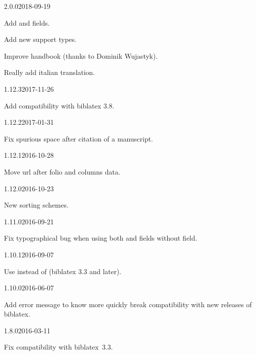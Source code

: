 \documentclass{ltxdockit}[2011/03/25]
\newcommand{\biblatex}{biblatex\xspace}
\begin{document}
\begin{changelog}

\begin{release}{2.0.0}{2018-09-19}
  \item Add  and  fields.
  \item Add new support types.
  \item Improve handbook (thanks to Dominik Wujastyk).
  \item Really add italian translation.
\end{release}

\begin{release}{1.12.3}{2017-11-26}
  \item Add compatibility with biblatex 3.8.
\end{release}
\begin{release}{1.12.2}{2017-01-31}
  \item Fix spurious space after citation of a manuscript.
\end{release}

\begin{release}{1.12.1}{2016-10-28}
  \item Move url after folio and columns data.
\end{release}

\begin{release}{1.12.0}{2016-10-23}
  \item New sorting schemes.
\end{release}

\begin{release}{1.11.0}{2016-09-21}
  \item Fix typographical bug when using both  and  fields without  field.
\end{release}

\begin{release}{1.10.1}{2016-09-07}
  \item Use  instead of  (biblatex 3.3 and later).
\end{release}

\begin{release}{1.10.0}{2016-06-07}
  \item Add error message to know more quickly break compatibility with new releases of biblatex.
\end{release}
\begin{release}{1.8.0}{2016-03-11}
	\item Fix compatibility with \biblatex~3.3.
\end{release}


\end{changelog}
\end{document}

